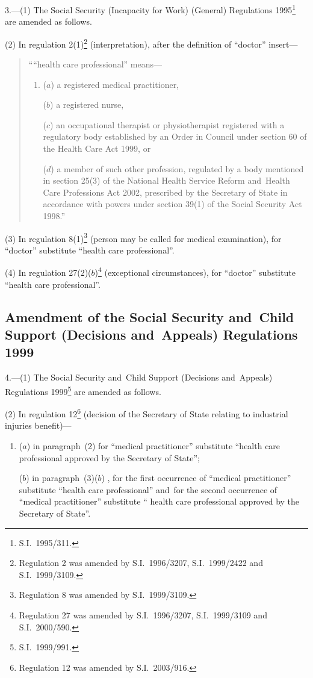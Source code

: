 \documentclass[12pt,a4paper]{article}
\begin{document}
3.---(1)  The Social Security (Incapacity for Work) (General) Regulations 1995\footnote{S.I.~1995/311.} are amended as follows.

(2) In regulation 2(1)\footnote{Regulation 2 was amended by S.I.~1996/3207, S.I.~1999/2422 and S.I.~1999/3109.} (interpretation), after the definition of “doctor” insert—
\begin{quotation}
““health care professional” means—
\begin{enumerate}\item[]
($a$) 
a registered medical practitioner,

($b$) 
a registered nurse,

($c$) 
an occupational therapist or physiotherapist registered with a regulatory body established by an Order in Council under section 60 of the Health Care Act 1999, or

($d$) 
a member of such other profession, regulated by a body mentioned in section 25(3) of the National Health Service Reform and~Health Care Professions Act 2002, prescribed by the Secretary of State in accordance with powers under section 39(1) of the Social Security Act 1998.”
\end{enumerate}
\end{quotation}

(3) In regulation 8(1)\footnote{Regulation 8 was amended by S.I.~1999/3109.} (person may be called for medical examination), for “doctor” substitute “health care professional”.

(4) In regulation 27(2)($b$)\footnote{Regulation 27 was amended by S.I.~1996/3207, S.I.~1999/3109 and S.I.~2000/590.} (exceptional circumstances), for “doctor” substitute “health care professional”.

\subsection[4. Amendment of the Social Security and~Child Support (Decisions and~Appeals) Regulations 1999]{Amendment of the Social Security and~Child Support (Decisions and~Appeals) Regulations 1999}

4.---(1)  The Social Security and~Child Support (Decisions and~Appeals) Regulations 1999\footnote{S.I.~1999/991.} are amended as follows.

(2) In regulation 12\footnote{Regulation 12 was amended by S.I.~2003/916.} (decision of the Secretary of State relating to industrial injuries benefit)—
\begin{enumerate}\item[]
($a$) in paragraph~(2) for “medical practitioner” substitute “health care professional approved by the Secretary of State”;

($b$) in paragraph~(3)($b$) , for the first occurrence of “medical practitioner” substitute “health care professional” and~for the second occurrence of “medical practitioner” substitute “ health care professional approved by the Secretary of State”.
\end{enumerate}
\end{document}
